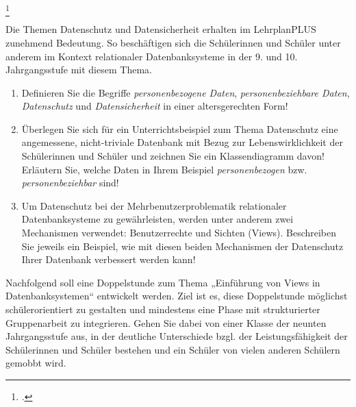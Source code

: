 \documentclass{bschlangaul-aufgabe}
\begin{document}
\footcite{examen:66118:2020:03}

Die Themen Datenschutz und Datensicherheit erhalten im LehrplanPLUS
zunehmend Bedeutung. So beschäftigen sich die Schülerinnen und Schüler
unter anderem im Kontext relationaler Datenbanksysteme in der 9. und
10. Jahrgangsstufe mit diesem Thema.

\begin{enumerate}
\item Definieren Sie die Begriffe \emph{personenbezogene Daten},
\emph{personenbeziehbare Daten}, \emph{Datenschutz} und
\emph{Datensicherheit} in einer
altersgerechten Form!

\item Überlegen Sie sich für ein Unterrichtsbeispiel zum Thema
Datenschutz eine angemessene, nicht-triviale Datenbank mit Bezug zur
Lebenswirklichkeit der Schülerinnen und Schüler und zeichnen Sie ein
Klassendiagramm davon! Erläutern Sie, welche Daten in Ihrem Beispiel
\emph{personenbezogen} bzw. \emph{personenbeziehbar} sind!

\item Um Datenschutz bei der Mehrbenutzerproblematik relationaler
Datenbanksysteme zu gewährleisten, werden unter anderem zwei
Mechanismen verwendet: Benutzerrechte und Sichten (Views). Beschreiben
Sie jeweils ein Beispiel, wie mit diesen beiden Mechanismen der
Datenschutz Ihrer Datenbank verbessert werden kann!
\end{enumerate}

\noindent
Nachfolgend soll eine Doppelstunde zum Thema „Einführung von Views in
Datenbanksystemen“ entwickelt werden. Ziel ist es, diese Doppelstunde
möglichst schülerorientiert zu gestalten und mindestens eine Phase mit
strukturierter Gruppenarbeit zu integrieren. Gehen Sie dabei von einer
Klasse der neunten Jahrgangsstufe aus, in der deutliche Unterschiede
bzgl. der Leistungsfähigkeit der Schülerinnen und Schüler bestehen und
ein Schüler von vielen anderen Schülern gemobbt wird.
\end{document}
